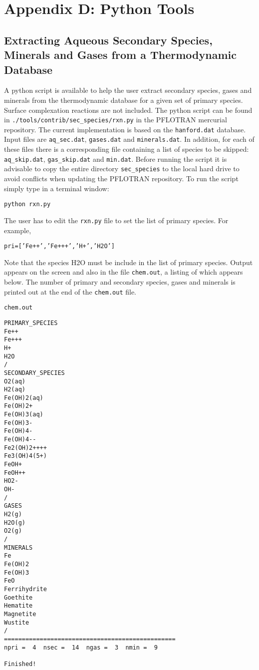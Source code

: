 
\section*{Appendix D: Python Tools}

\setcounter{section}{4}
\setcounter{subsection}{0}
\setcounter{equation}{0}
\setcounter{table}{0}
\setcounter{figure}{0}

\subsection{Extracting Aqueous Secondary Species, Minerals and Gases from a Thermodynamic Database}

A python script is available to help the user extract secondary species, gases and minerals from the thermodynamic database for a given set of primary species. Surface complexation reactions are not included. The python script can be found in {\tt ./tools/contrib/sec\_species/rxn.py} in the PFLOTRAN mercurial repository. 
The current implementation is based on the {\tt hanford.dat} database.
Input files are {\tt aq\_sec.dat}, {\tt gases.dat} and {\tt minerals.dat}. In addition, for each of these files there is a corresponding file containing a list of species to be skipped: {\tt aq\_skip.dat}, {\tt gas\_skip.dat} and {\tt min.dat}.
Before running the script it is advisable to copy the entire directory {\tt sec\_species} to the local hard drive to avoid conflicts when updating the PFLOTRAN repository. To run the script simply type in a terminal window: 

{\tt python rxn.py}

\noindent
The user has to edit the {\tt rxn.py} file to set the list of primary species. For example,

{\tt pri=['Fe++','Fe+++','H+','H2O']}

\noindent
Note that the species H2O must be include in the list of primary species.
Output appears on the screen and also in the file {\tt chem.out}, a listing of which appears below. The number of primary and secondary species, gases and minerals is printed out at the end of the {\tt chem.out} file.

\noindent
{\tt chem.out} 

\footnotesize
\begin{verbatim}
PRIMARY_SPECIES
Fe++
Fe+++
H+
H2O
/
SECONDARY_SPECIES
O2(aq)
H2(aq)
Fe(OH)2(aq)
Fe(OH)2+
Fe(OH)3(aq)
Fe(OH)3-
Fe(OH)4-
Fe(OH)4--
Fe2(OH)2++++
Fe3(OH)4(5+)
FeOH+
FeOH++
HO2-
OH-
/
GASES
H2(g)
H2O(g)
O2(g)
/
MINERALS
Fe
Fe(OH)2
Fe(OH)3
FeO
Ferrihydrite
Goethite
Hematite
Magnetite
Wustite
/
================================================
npri =  4  nsec =  14  ngas =  3  nmin =  9

Finished!
\end{verbatim}
\normalsize
